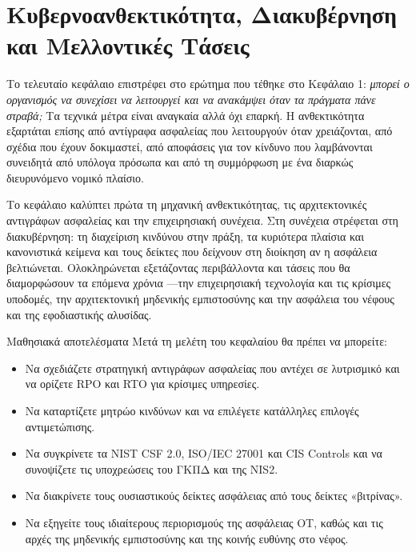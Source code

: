 \chapter{Κυβερνοανθεκτικότητα, Διακυβέρνηση και Μελλοντικές Τάσεις}\label{ch:13}

Το τελευταίο κεφάλαιο επιστρέφει στο ερώτημα που τέθηκε στο Κεφάλαιο 1: \emph{μπορεί ο οργανισμός να συνεχίσει να λειτουργεί και να ανακάμψει όταν τα πράγματα πάνε στραβά;} Τα τεχνικά μέτρα είναι αναγκαία αλλά όχι επαρκή. Η ανθεκτικότητα εξαρτάται επίσης από αντίγραφα ασφαλείας που λειτουργούν όταν χρειάζονται, από σχέδια που έχουν δοκιμαστεί, από αποφάσεις για τον κίνδυνο που λαμβάνονται συνειδητά από υπόλογα πρόσωπα και από τη συμμόρφωση με ένα διαρκώς διευρυνόμενο νομικό πλαίσιο.

Το κεφάλαιο καλύπτει πρώτα τη μηχανική ανθεκτικότητας, τις αρχιτεκτονικές αντιγράφων ασφαλείας και την επιχειρησιακή συνέχεια. Στη συνέχεια στρέφεται στη διακυβέρνηση: τη διαχείριση κινδύνου στην πράξη, τα κυριότερα πλαίσια και κανονιστικά κείμενα και τους δείκτες που δείχνουν στη διοίκηση αν η ασφάλεια βελτιώνεται. Ολοκληρώνεται εξετάζοντας περιβάλλοντα και τάσεις που θα διαμορφώσουν τα επόμενα χρόνια —την επιχειρησιακή τεχνολογία και τις κρίσιμες υποδομές, την αρχιτεκτονική μηδενικής εμπιστοσύνης και την ασφάλεια του νέφους και της εφοδιαστικής αλυσίδας.

\begin{outcomesbox}{Μαθησιακά αποτελέσματα}
Μετά τη μελέτη του κεφαλαίου θα πρέπει να μπορείτε:
\begin{itemize}
  \item Να σχεδιάζετε στρατηγική αντιγράφων ασφαλείας που αντέχει σε λυτρισμικό και να ορίζετε RPO και RTO για κρίσιμες υπηρεσίες.
  \item Να καταρτίζετε μητρώο κινδύνων και να επιλέγετε κατάλληλες επιλογές αντιμετώπισης.
  \item Να συγκρίνετε τα NIST CSF 2.0, ISO/IEC 27001 και CIS Controls και να συνοψίζετε τις υποχρεώσεις του ΓΚΠΔ και της NIS2.
  \item Να διακρίνετε τους ουσιαστικούς δείκτες ασφάλειας από τους δείκτες «βιτρίνας».
  \item Να εξηγείτε τους ιδιαίτερους περιορισμούς της ασφάλειας OT, καθώς και τις αρχές της μηδενικής εμπιστοσύνης και της κοινής ευθύνης στο νέφος.
\end{itemize}
\end{outcomesbox}

